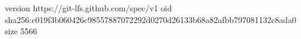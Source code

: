 version https://git-lfs.github.com/spec/v1
oid sha256:c019f3b060426c98557887072292d0270d26133b68a82afbb797081132c8ada0
size 5566
